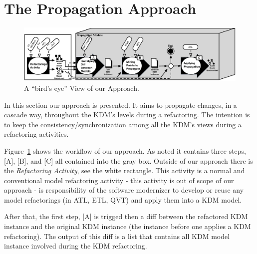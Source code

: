 %
\section{The Propagation Approach} %
\label{sec:the_approach}

\begin{figure}[t]
	\centering
	\includegraphics[scale=0.545]{figuras/ApproachLifeCicle2}
	\caption{A ``bird's eye'' View of our Approach.}
	\label{fig:approach}
\end{figure}

In this section our approach is presented. It aims to propagate changes, in a cascade way, throughout the KDM's levels during a refactoring. The intention is to keep the consistency/synchronization among all the KDM's views during a refactoring activities.


%
Figure~\ref{fig:approach} shows the workflow of our approach. As noted it contains three steps, [A], [B], and [C] all contained into the gray box. Outside of our approach there is the \textit{Refactoring Activity}, see the white rectangle. This activity is a normal and conventional model refactoring activity - this activity is out of scope of our approach - is responsibility of the software modernizer to develop or reuse any model refactorings (in ATL, ETL, QVT) and apply them into a KDM model. %

After that, the first step, [A] is trigged then a diff between the refactored KDM instance and the original KDM instance (the instance before one applies a KDM refactoring). The output of this diff is a list that contains all KDM model instance involved during the KDM refactoring. %

